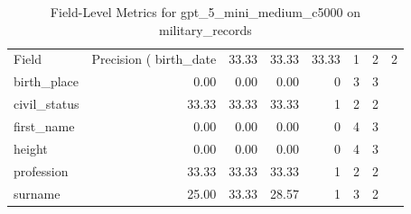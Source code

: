 \begin{table}
\caption{Field-Level Metrics for gpt_5_mini_medium_c5000 on military_records}
\label{tab:fields_gpt_5_mini_medium_c5000_military_records}
\begin{tabular}{lrrrrrr}
\toprule
Field & Precision (%
\midrule
birth_date & 33.33 & 33.33 & 33.33 & 1 & 2 & 2 \\
birth_place & 0.00 & 0.00 & 0.00 & 0 & 3 & 3 \\
civil_status & 33.33 & 33.33 & 33.33 & 1 & 2 & 2 \\
first_name & 0.00 & 0.00 & 0.00 & 0 & 4 & 3 \\
height & 0.00 & 0.00 & 0.00 & 0 & 4 & 3 \\
profession & 33.33 & 33.33 & 33.33 & 1 & 2 & 2 \\
surname & 25.00 & 33.33 & 28.57 & 1 & 3 & 2 \\
\bottomrule
\end{tabular}
\end{table}
